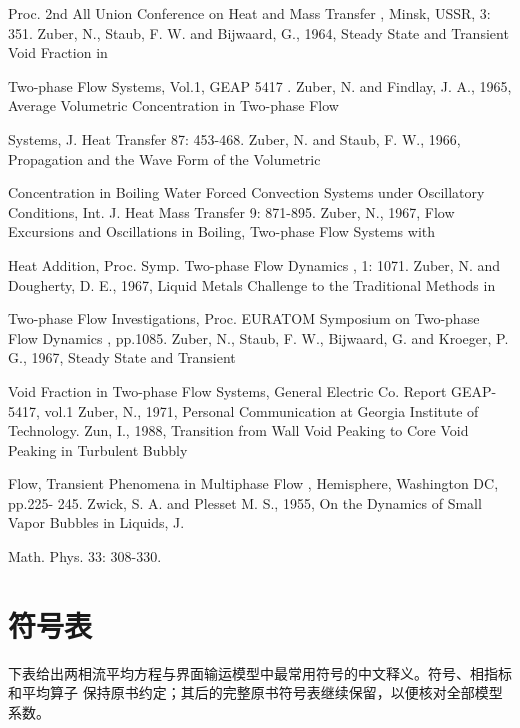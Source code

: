 \documentclass[11pt,a4paper,openany,fontset=none]{ctexbook}
\begin{document}
{\small\raggedright\noindent Proc. 2nd All Union Conference on Heat and Mass Transfer , Minsk, USSR, 3: 351. Zuber, N., Staub, F. W. and Bijwaard, G., 1964, Steady State and Transient Void Fraction in\par}
{\small\raggedright\noindent Two-phase Flow Systems, Vol.1, GEAP 5417 . Zuber, N. and Findlay, J. A., 1965, Average Volumetric Concentration in Two-phase Flow\par}
{\small\raggedright\noindent Systems, J. Heat Transfer 87: 453-468. Zuber, N. and Staub, F. W., 1966, Propagation and the Wave Form of the Volumetric\par}
{\small\raggedright\noindent Concentration in Boiling Water Forced Convection Systems under Oscillatory Conditions, Int. J. Heat Mass Transfer 9: 871-895. Zuber, N., 1967, Flow Excursions and Oscillations in Boiling, Two-phase Flow Systems with\par}
{\small\raggedright\noindent Heat Addition, Proc. Symp. Two-phase Flow Dynamics , 1: 1071. Zuber, N. and Dougherty, D. E., 1967, Liquid Metals Challenge to the Traditional Methods in\par}
{\small\raggedright\noindent Two-phase Flow Investigations, Proc. EURATOM Symposium on Two-phase Flow Dynamics , pp.1085. Zuber, N., Staub, F. W., Bijwaard, G. and Kroeger, P. G., 1967, Steady State and Transient\par}
{\small\raggedright\noindent Void Fraction in Two-phase Flow Systems, General Electric Co. Report GEAP-5417, vol.1 Zuber, N., 1971, Personal Communication at Georgia Institute of Technology. Zun, I., 1988, Transition from Wall Void Peaking to Core Void Peaking in Turbulent Bubbly\par}
{\small\raggedright\noindent Flow, Transient Phenomena in Multiphase Flow , Hemisphere, Washington DC, pp.225- 245. Zwick, S. A. and Plesset M. S., 1955, On the Dynamics of Small Vapor Bubbles in Liquids, J.\par}
{\small\raggedright\noindent Math. Phys. 33: 308-330.\par}
\chapter*{符号表}
下表给出两相流平均方程与界面输运模型中最常用符号的中文释义。符号、相指标和平均算子
保持原书约定；其后的完整原书符号表继续保留，以便核对全部模型系数。
\end{document}
